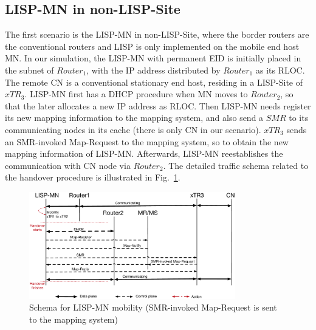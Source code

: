 \subsection{LISP-MN in non-LISP-Site}
\label{sec:ns3_analysis_lispmn}
The first scenario is the LISP-MN in non-LISP-Site, where the border routers are the conventional routers and LISP is only implemented on the mobile end host MN. In our simulation, the LISP-MN with permanent EID is initially placed in the subnet of $Router_1$, with the IP address distributed by $Router_1$ as its RLOC. The remote CN is a conventional stationary end host, residing in a LISP-Site of $xTR_3$. %
LISP-MN first has a DHCP procedure when MN moves to $Router_2$, so that the later allocates a new IP address as RLOC. Then LISP-MN needs register its new mapping information to the mapping system, and also send a $SMR$ to its communicating nodes in its cache (there is only CN in our scenario). $xTR_3$ sends an SMR-invoked Map-Request to the mapping system, so to obtain the new mapping information of LISP-MN. Afterwards, LISP-MN reestablishes the communication with CN node via $Router_2$. The detailed traffic schema related to the handover procedure is illustrated in Fig.~\ref{sim_schema_LISPMN}.  %
\begin{figure}[!th]
	\centering
	\includegraphics[width=0.8\textwidth]{Pics/Mobility_LISPMN_schema_SMR_simplify}
	\caption{Schema for LISP-MN mobility (SMR-invoked Map-Request is sent to the mapping system)}
	\label{sim_schema_LISPMN}
\end{figure}

